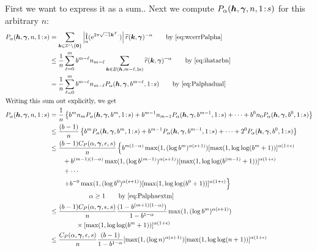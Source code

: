 \documentclass{iitthesis-au} %
\newcommand{\tr}{\widetilde{r}}
\DeclareMathOperator{\appxint}{\hat{I}}
\newcommand{\onetos}{1\!:\!s}
\newcommand{\LarysaNote}[1]{{\color{violet}#1}}
\begin{document}
\LarysaNote{First we want to express it as a sum.. } 
Next we compute $P_\alpha(\vh,\vgamma,n,\onetos)$ for this arbitrary $n$:
\begin{align*}
      P_\alpha(\vh,\vgamma,n,\onetos) & = \sum_{\vk \in \integers^s \setminus\{\vzero\}} \abs{\appxint_n(\me^{2 \pi \sqrt{-1} \vk^T \cdot})}\tr(\vk,\vgamma)^{-\alpha} \qquad \text{by \eqref{eq:wcerrPalpha}} \\
      & \le \frac {1}{n} \sum_{\ell = 0}^{m} b^{m-\ell} n_{m - \ell} \sum_{\vk \in B(\vh,m-\ell,\onetos)} \tr(\vk,\vgamma)^{-\alpha}
      \qquad \text{by \eqref{eq:ihatarbn}}\\
      & = \frac {1}{n} \sum_{\ell = 0}^{m} b^{m-\ell} n_{m - \ell} P_\alpha(\vh,\vgamma,b^{m-\ell},\onetos)
      \qquad \text{by \eqref{eq:Palphadual}}\\
\intertext{Writing this sum out explicitly, we get}
      P_\alpha(\vh,\vgamma,n,\onetos) & =  \frac {1}{n} \left\{ b^m n_m P_\alpha(\vh,\vgamma,b^m,\onetos) + b^{m-1} n_{m-1} P_\alpha(\vh,\vgamma,b^{m-1},\onetos) + \cdots + b^0 n_0 P_\alpha(\vh,\vgamma,b^0,\onetos)  \right\} \\
      &\le \frac {(b-1)}{n} \left\{ b^m  P_\alpha(\vh,\vgamma,b^m,\onetos) + b^{m-1}  P_\alpha(\vh,\vgamma,b^{m-1},\onetos) + \cdots + 2^0  P_\alpha(\vh,\vgamma,b^0,\onetos)  \right\} \\
      & \le \frac {(b-1)C_{P}(\alpha,\vgamma,\epsilon,s)}{n} \left\{ b^{m(1-\alpha)}\max(1, (\log b^{m})^{\alpha(s+1)}) [\max(1,\log \log (
    b^m+1))]^{\alpha(1+\epsilon)}\right .\\ 
      & \qquad  + b^{(m-1)(1-\alpha)}\max(1, (\log b^{(m-1)})^{\alpha(s+1)}) [\max(1,\log \log (
    b^{(m-1)}+1))]^{\alpha(1+\epsilon)}\\
      & \qquad + \cdots \\
      & \qquad  \left . + b^{-0}\max(1, (\log b^{0})^{\alpha(s+1)}) [\max(1,\log \log (
    b^{0}+1))]^{\alpha(1+\epsilon)} \right\}\\
      & \qquad \qquad \qquad \alpha \ge 1 \qquad \text{by \eqref{eq:Palphaextm}}\\
      & \le \frac {(b-1)C_{P}(\alpha,\vgamma,\epsilon,s)}{n} \frac{(1 - b^{(m+1)(1-\alpha)})}{1 - b^{1-\alpha}}
      \max(1, (\log b^{m})^{\alpha(s+1)}) \\
      & \qquad \qquad \times [\max(1,\log \log (
    b^m+1))]^{\alpha(1+\epsilon)} \\
      & \le \frac {C_{P}(\alpha,\vgamma,\epsilon,s)}{n} \frac{(b-1)}{1 - b^{1-\alpha}}
  [\max(1, (\log n)^{\alpha(s+1)})
      [\max(1,\log \log (n+1))]^{\alpha(1+\epsilon)} 
\end{align*}
\end{document}
